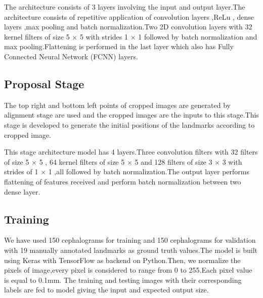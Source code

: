 \documentclass[sn-mathphys]{sn-jnl}%
\theoremstyle{thmstyleone}%
\theoremstyle{thmstyletwo}%
\theoremstyle{thmstylethree}%
\begin{document}
 \par 
 The architecture consists of 3 layers involving the input and output layer.The architecture consists of repetitive application of convolution layers ,ReLu , dense layers ,max pooling and batch normalization.Two 2D convolution layers with 32 kernel filters of size 5 × 5 with strides 1 × 1 followed by batch normalization and max pooling.Flattening is performed in the last layer which also has Fully Connected Neural Network (FCNN) layers.
 
 
 
 
 \subsection{Proposal Stage}
 The top right and bottom left points of cropped images are  generated by alignment stage are used and the cropped images are the inputs to this stage.This stage is developed to generate the initial positions of the landmarks according to cropped image.
 
 
  \par This stage architecture model has 4 layers.Three convolution filters with 32 filters of size 5 × 5 , 64 kernel filters of size 5 × 5 and 128 filters of size 3 × 3 with strides of 1 × 1 ,all followed by batch normalization.The output layer performs flattening of features received and perform batch normalization between two dense layer. 
 
 
 \subsection{Training}
 
We have used 150 cephalograms for training and 150 cephalograms for validation  with 19 manually annotated landmarks as ground truth values.The model  is built using Keras with TensorFlow as backend on Python.Then, we normalize the pixels of image,every pixel is considered to range from 0 to 255.Each pixel value is equal to 0.1mm. The training and testing images with their corresponding labels are fed to model giving the input and expected output size.
 
\end{document}
